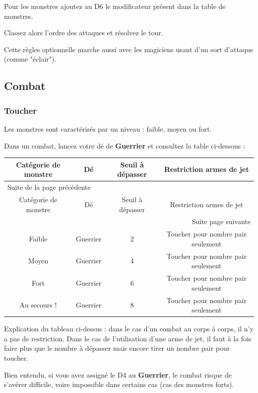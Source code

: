 \documentclass[a4paper, 11pt, twoside]{article}
\begin{document}
Pour les monstres ajoutez au D6 le modificateur présent dans la table de monstres.

Classez alors l'ordre des attaques et résolvez le tour.

Cette règles optionnelle marche aussi avec les magiciens usant d'un sort d'attaque (comme "éclair").

\subsection{Combat}
\label{sec:org422ac92}
\subsubsection{Toucher}
\label{sec:org9e31a5f}

Les monstres sont caractérisés par un niveau : faible, moyen ou fort.

Dans un combat, lancez votre dé de \textbf{Guerrier} et consultez la table ci-dessous :

\begin{longtable}{c|c|c|c}
Catégorie de monstre & Dé & Seuil à dépasser & Restriction armes de jet\\
\hline
\endfirsthead
\multicolumn{4}{l}{Suite de la page précédente} \\
\hline

Catégorie de monstre & Dé & Seuil à dépasser & Restriction armes de jet \\

\hline
\endhead
\hline\multicolumn{4}{r}{Suite page suivante} \\
\endfoot
\endlastfoot
\hline
Faible & Guerrier & 2 & Toucher pour nombre pair seulement\\
Moyen & Guerrier & 4 & Toucher pour nombre pair seulement\\
Fort & Guerrier & 6 & Toucher pour nombre pair seulement\\
Au secours ! & Guerrier & 8 & Toucher pour nombre pair seulement\\
\end{longtable}

Explication du tableau ci-dessus : dans le cas d'un combat au corps à corps, il n'y a pas de restriction. Dans le cas de l'utilisation d'une arme de jet, il faut à la fois faire plus que le nombre à dépasser mais encore tirer un nombre pair pour toucher. 

Bien entendu, si vous avez assigné le D4 au \textbf{Guerrier}, le combat risque de s'avérer difficile, voire impossible dans certains cas (cas des monstres forts).
\end{document}
